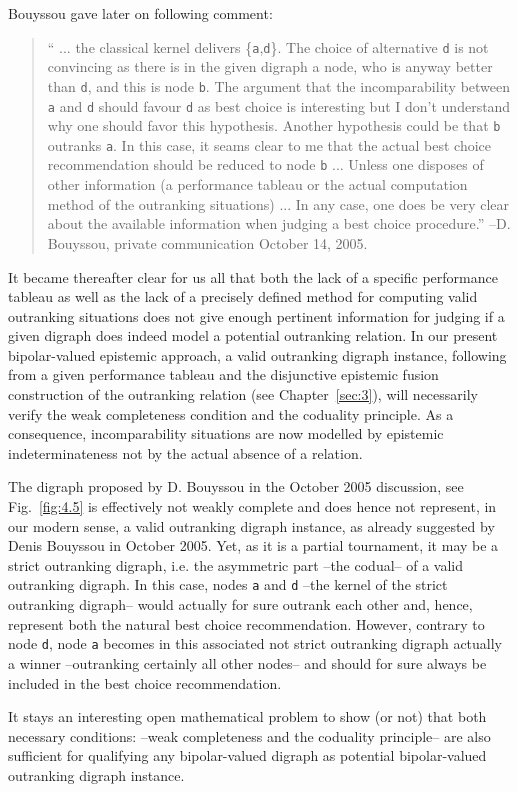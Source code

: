 \noindent Bouyssou gave later on following comment:
\begin{quotation}
`` ... the classical kernel delivers \{\texttt{a},\texttt{d}\}. The choice of alternative \texttt{d} is not convincing as there is in the given digraph a node, who is anyway better than \texttt{d}, and this is node \texttt{b}. The argument that the incomparability between \texttt{a} and \texttt{d} should favour \texttt{d} as best choice is interesting but I don't understand why one should favor this hypothesis. Another hypothesis could be that \texttt{b} outranks \texttt{a}. In this case, it seams clear to me that the actual best choice recommendation should be reduced to node \texttt{b} ... Unless one disposes of other information (a performance tableau or the actual computation method of the outranking situations) ... In any case, one does be very clear about the available information when judging a best choice procedure.'' --D. Bouyssou, private communication October 14, 2005.
\end{quotation}
It became thereafter clear for us all that both the lack of a specific performance tableau as well as the lack of a precisely defined method for computing valid outranking situations does not give enough pertinent information for judging if a given digraph does indeed model a potential outranking relation. In our present bipolar-valued epistemic approach, a valid outranking digraph instance, following from a given performance tableau and the disjunctive epistemic fusion construction of the outranking relation (see Chapter~\ref{sec:3}), will necessarily verify the weak completeness condition and the coduality principle. As a consequence, incomparability situations are now modelled by epistemic indeterminateness not by the actual absence of a relation.

The digraph proposed by D. Bouyssou in the October 2005 discussion, see Fig.~\ref{fig:4.5} is effectively not weakly complete and does hence not represent, in our modern sense, a valid outranking digraph instance, as already suggested by Denis Bouyssou in October 2005. Yet, as it is a partial tournament, it may be a strict outranking digraph, i.e. the asymmetric part --the codual-- of a valid outranking digraph. In this case, nodes \texttt{a} and \texttt{d} --the kernel of the strict outranking digraph-- would actually for sure outrank each other and, hence, represent both the natural best choice recommendation. However, contrary to node \texttt{d}, node \texttt{a} becomes in this associated not strict outranking digraph actually a \Condorcet winner --outranking certainly all other nodes-- and should for sure always be included in the best choice recommendation.

It stays an interesting open mathematical problem to show (or not) that both necessary conditions: --weak completeness and the coduality principle-- are also sufficient for qualifying any bipolar-valued digraph as potential bipolar-valued outranking digraph instance.


\clearpage


%

